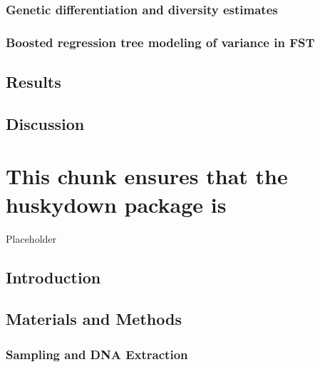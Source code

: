 \documentclass[twoside,12pt,final]{ucthesis-CA2012} %
\begin{document}
\begin{ucmainmatter}
{\subsection{Genetic differentiation and diversity
estimates}\label{genetic-differentiation-and-diversity-estimates}}

\hypertarget{boosted-regression-tree-modeling-of-variance-in-fst}{%
\subsection{Boosted regression tree modeling of variance in
FST}\label{boosted-regression-tree-modeling-of-variance-in-fst}}

\hypertarget{results}{%
\section{Results}\label{results}}

\hypertarget{discussion}{%
\section{Discussion}\label{discussion}}

\hypertarget{this-chunk-ensures-that-the-huskydown-package-is}{%
\chapter{This chunk ensures that the huskydown package
is}\label{this-chunk-ensures-that-the-huskydown-package-is}}

Placeholder

\hypertarget{introduction-1}{%
\section{Introduction}\label{introduction-1}}

\hypertarget{materials-and-methods}{%
\section{Materials and Methods}\label{materials-and-methods}}

\hypertarget{sampling-and-dna-extraction}{%
\subsection{Sampling and DNA
Extraction}\label{sampling-and-dna-extraction}}

\hypertarget{rapture-sequencing-1}{%
}
\end{ucmainmatter}
\end{document}
